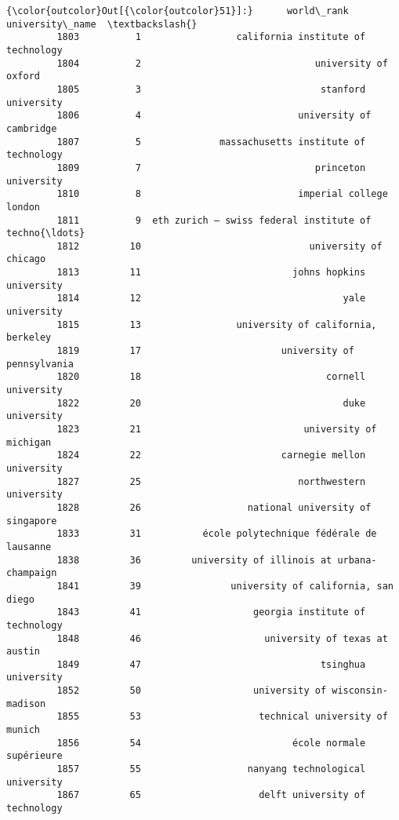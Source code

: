\documentclass[11pt]{article}
\begin{document}
\begin{Verbatim}[commandchars=\\\{\}]
{\color{outcolor}Out[{\color{outcolor}51}]:}      world\_rank                                    university\_name  \textbackslash{}
         1803          1                 california institute of technology   
         1804          2                               university of oxford   
         1805          3                                stanford university   
         1806          4                            university of cambridge   
         1807          5              massachusetts institute of technology   
         1809          7                               princeton university   
         1810          8                            imperial college london   
         1811          9  eth zurich – swiss federal institute of techno{\ldots}   
         1812         10                              university of chicago   
         1813         11                           johns hopkins university   
         1814         12                                    yale university   
         1815         13                 university of california, berkeley   
         1819         17                         university of pennsylvania   
         1820         18                                 cornell university   
         1822         20                                    duke university   
         1823         21                             university of michigan   
         1824         22                         carnegie mellon university   
         1827         25                            northwestern university   
         1828         26                   national university of singapore   
         1833         31           école polytechnique fédérale de lausanne   
         1838         36         university of illinois at urbana-champaign   
         1841         39                university of california, san diego   
         1843         41                    georgia institute of technology   
         1848         46                      university of texas at austin   
         1849         47                                tsinghua university   
         1852         50                    university of wisconsin-madison   
         1855         53                     technical university of munich   
         1856         54                           école normale supérieure   
         1857         55                   nanyang technological university   
         1867         65                     delft university of technology   

\end{Verbatim}
\end{document}
